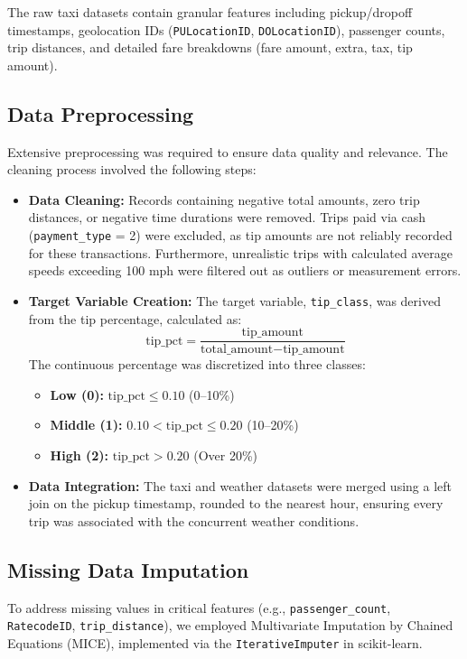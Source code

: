 \documentclass[11pt]{article}
\begin{document}
The raw taxi datasets contain granular features including pickup/dropoff timestamps, geolocation IDs (\texttt{PULocationID}, \texttt{DOLocationID}), passenger counts, trip distances, and detailed fare breakdowns (fare amount, extra, tax, tip amount).

\subsection{Data Preprocessing}
Extensive preprocessing was required to ensure data quality and relevance. The cleaning process involved the following steps:

\begin{itemize}
    \item \textbf{Data Cleaning:} Records containing negative total amounts, zero trip distances, or negative time durations were removed. Trips paid via cash (\texttt{payment\_type} = 2) were excluded, as tip amounts are not reliably recorded for these transactions. Furthermore, unrealistic trips with calculated average speeds exceeding 100 mph were filtered out as outliers or measurement errors.

    \item \textbf{Target Variable Creation:} The target variable, \texttt{tip\_class}, was derived from the tip percentage, calculated as:
    \begin{equation}
        \text{tip\_pct} = \frac{\text{tip\_amount}}{\text{total\_amount} - \text{tip\_amount}}
    \end{equation}
    The continuous percentage was discretized into three classes:
\begin{itemize}
        \item \textbf{Low (0):} $\text{tip\_pct} \leq 0.10$ (0--10\%)
        \item \textbf{Middle (1):} $0.10 < \text{tip\_pct} \leq 0.20$ (10--20\%)
        \item \textbf{High (2):} $\text{tip\_pct} > 0.20$ (Over 20\%)
    \end{itemize}

    \item \textbf{Data Integration:} The taxi and weather datasets were merged using a left join on the pickup timestamp, rounded to the nearest hour, ensuring every trip was associated with the concurrent weather conditions.
\end{itemize}

\subsection{Missing Data Imputation}
To address missing values in critical features (e.g., \texttt{passenger\_count}, \texttt{RatecodeID}, \texttt{trip\_distance}), we employed Multivariate Imputation by Chained Equations (MICE), implemented via the \texttt{IterativeImputer} in scikit-learn.
\end{document}
